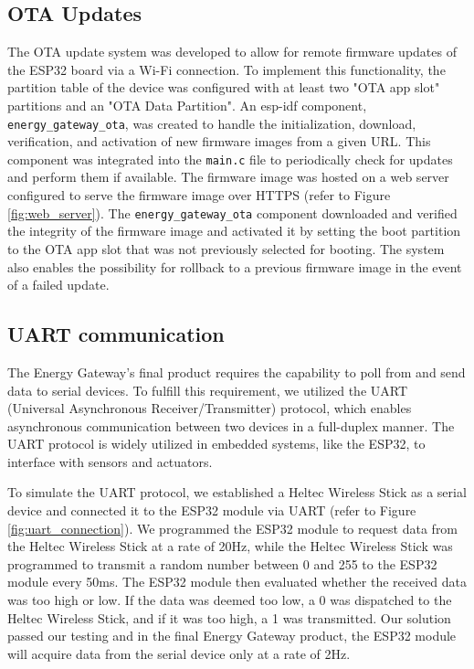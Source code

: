 \subsection{OTA Updates}

The OTA update system was developed to allow for remote firmware updates of the ESP32 board via a Wi-Fi connection. To implement this functionality, the partition table of the device was configured with at least two "OTA app slot" partitions and an "OTA Data Partition". An esp-idf component, \texttt{energy\_gateway\_ota}, was created to handle the initialization, download, verification, and activation of new firmware images from a given URL. This component was integrated into the \texttt{main.c} file to periodically check for updates and perform them if available. The firmware image was hosted on a web server configured to serve the firmware image over HTTPS (refer to Figure \ref{fig:web_server}). The \texttt{energy\_gateway\_ota} component downloaded and verified the integrity of the firmware image and activated it by setting the boot partition to the OTA app slot that was not previously selected for booting. The system also enables the possibility for rollback to a previous firmware image in the event of a failed update.

\subsection{UART communication}

The Energy Gateway's final product requires the capability to poll from and send data to serial devices. To fulfill this requirement, we utilized the UART (Universal Asynchronous Receiver/Transmitter) protocol, which enables asynchronous communication between two devices in a full-duplex manner. The UART protocol is widely utilized in embedded systems, like the ESP32, to interface with sensors and actuators.

To simulate the UART protocol, we established a Heltec Wireless Stick as a serial device and connected it to the ESP32 module via UART (refer to Figure \ref{fig:uart_connection}). We programmed the ESP32 module to request data from the Heltec Wireless Stick at a rate of 20Hz, while the Heltec Wireless Stick was programmed to transmit a random number between 0 and 255 to the ESP32 module every 50ms. The ESP32 module then evaluated whether the received data was too high or low. If the data was deemed too low, a 0 was dispatched to the Heltec Wireless Stick, and if it was too high, a 1 was transmitted. Our solution passed our testing and in the final Energy Gateway product, the ESP32 module will acquire data from the serial device only at a rate of 2Hz.

